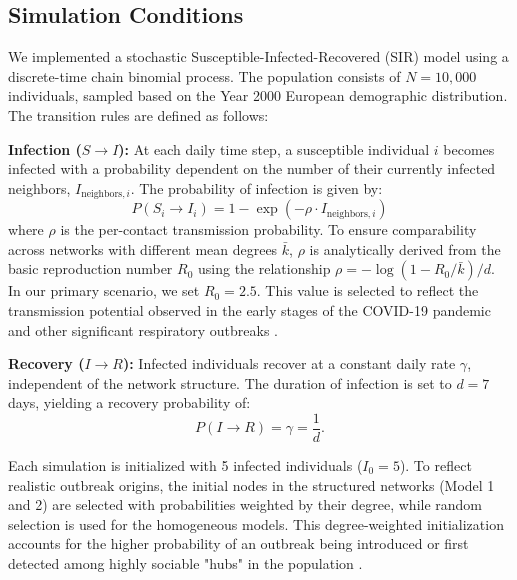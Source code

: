 \subsection{Simulation Conditions}
We implemented a stochastic Susceptible-Infected-Recovered (SIR) model using a discrete-time chain binomial process.
The population consists of $N = 10,000$ individuals, sampled based on the Year 2000 European demographic distribution.
The transition rules are defined as follows:

\textbf{Infection ($S \to I$):}
At each daily time step, a susceptible individual $i$ becomes infected with a probability dependent on the number of their currently infected neighbors, $I_{\text{neighbors}, i}$.
The probability of infection is given by:
$$P(S_i \to I_i) = 1 - \exp(-\rho \cdot I_{\text{neighbors}, i})$$
where $\rho$ is the per-contact transmission probability.
To ensure comparability across networks with different mean degrees $\bar{k}$, $\rho$ is analytically derived from the basic reproduction number $R_0$ using the relationship $\rho = -\log(1 - R_0 / \bar{k}) / d$.
In our primary scenario, we set $R_0 = 2.5$.
This value is selected to reflect the transmission potential observed in the early stages of the COVID-19 pandemic and other significant respiratory outbreaks \parencite{alimohamadi2020estimate, billah2020reproductive}.

\textbf{Recovery ($I \to R$):}
Infected individuals recover at a constant daily rate $\gamma$, independent of the network structure.
The duration of infection is set to $d = 7$ days, yielding a recovery probability of:
$$P(I \to R) = \gamma = \frac{1}{d}.$$

Each simulation is initialized with 5 infected individuals ($I_0 = 5$).
To reflect realistic outbreak origins, the initial nodes in the structured networks (Model 1 and 2) are selected with probabilities weighted by their degree, while random selection is used for the homogeneous models.
This degree-weighted initialization accounts for the higher probability of an outbreak being introduced or first detected among highly sociable "hubs" in the population \parencite{lloyd-smith2005superspreading}.